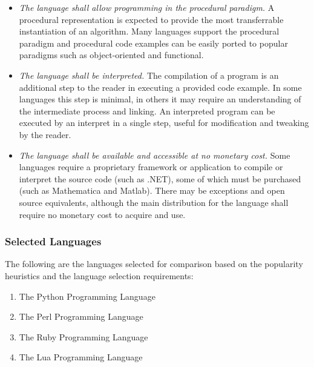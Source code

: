 \documentclass[a4paper, 11pt]{article}
\begin{document}
\begin{itemize}
	\item \emph{The language shall allow programming in the procedural paradigm.} A procedural representation is expected to provide the most transferrable instantiation of an algorithm. Many languages support the procedural paradigm and procedural code examples can be easily ported to popular paradigms such as object-oriented and functional.
	\item \emph{The language shall be interpreted.} The compilation of a program is an additional step to the reader in executing a provided code example. In some languages this step is minimal, in others it may require an understanding of the intermediate process and linking. An interpreted program can be executed by an interpret in a single step, useful for modification and tweaking by the reader.
	\item \emph{The language shall be available and accessible at no monetary cost.} Some languages require a proprietary framework or application to compile or interpret the source code (such as .NET), some of which must be purchased (such as Mathematica and Matlab). There may be exceptions and open source equivalents, although the main distribution for the language shall require no monetary cost to acquire and use.
\end{itemize}

% 
% 
\subsubsection{Selected Languages}
\label{subsubsec:selection}
The following are the languages selected for comparison based on the popularity heuristics and the language selection requirements:
\begin{enumerate}
	\item The Python Programming Language
	\item The Perl Programming Language
	\item The Ruby Programming Language
	\item The Lua Programming Language
\end{enumerate}
\end{document}
